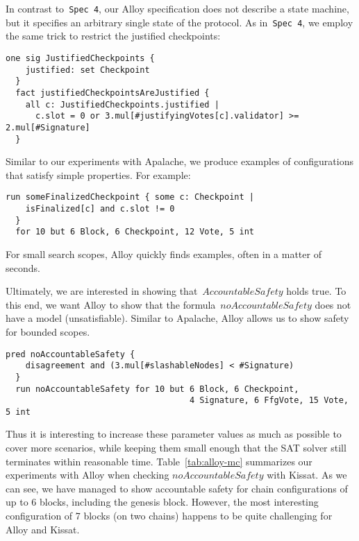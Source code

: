 In contrast to~\texttt{Spec 4}, our Alloy specification does not describe a
state machine, but it specifies an arbitrary single state of the protocol. As
in~\texttt{Spec 4}, we employ the same trick to restrict the justified
checkpoints:

\begin{lstlisting}[language=alloy,columns=fullflexible]
  one sig JustifiedCheckpoints {
    justified: set Checkpoint
  }
  fact justifiedCheckpointsAreJustified {
    all c: JustifiedCheckpoints.justified |
      c.slot = 0 or 3.mul[#justifyingVotes[c].validator] >= 2.mul[#Signature]
  }
\end{lstlisting}

Similar to our experiments with Apalache, we produce examples of configurations
that satisfy simple properties. For example:

\begin{lstlisting}[language=alloy,columns=fullflexible]
  run someFinalizedCheckpoint { some c: Checkpoint |
    isFinalized[c] and c.slot != 0
  }
  for 10 but 6 Block, 6 Checkpoint, 12 Vote, 5 int
\end{lstlisting}

For small search scopes, Alloy quickly finds examples, often in a matter
of seconds.

Ultimately, we are interested in showing that~$\textit{AccountableSafety}$
holds true. To this end, we want Alloy to show that the
formula~$\textit{noAccountableSafety}$ does not have a model (unsatisfiable).
Similar to Apalache, Alloy allows us to show safety for bounded scopes.

\begin{lstlisting}[language=alloy,columns=fullflexible]
  pred noAccountableSafety {
    disagreement and (3.mul[#slashableNodes] < #Signature)
  }
  run noAccountableSafety for 10 but 6 Block, 6 Checkpoint,
                                     4 Signature, 6 FfgVote, 15 Vote, 5 int
\end{lstlisting}

Thus it is interesting to increase these parameter values as much as possible to cover more scenarios, while keeping them small enough that the SAT solver still terminates within reasonable time.
Table~\ref{tab:alloy-mc} summarizes our experiments with Alloy when checking
$\textit{noAccountableSafety}$ with Kissat. As we can see, we have managed to
show accountable safety for chain configurations of up to 6 blocks,
including the genesis block. However, the most interesting configuration of 7 blocks
(on two chains) happens to be quite challenging for Alloy and Kissat.

